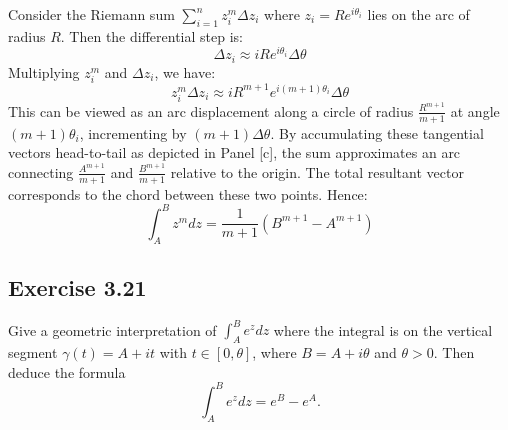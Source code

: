\documentclass{article}
\begin{document}
\begin{solution}
\begin{center}
  \end{center}

  \vspace{1em}
  Consider the Riemann sum $\sum_{i=1}^{n} z_i^m \Delta z_i$ where
  $z_i = Re^{i\theta_i}$ lies on the arc of radius $R$. Then the
  differential step is:
  \[
    \Delta z_i \approx iRe^{i\theta_i}\Delta\theta
  \]
  Multiplying $z_i^m$ and $\Delta z_i$, we have:
  \[
    z_i^m \Delta z_i \approx iR^{m+1}e^{i(m+1)\theta_i}\Delta\theta
  \]
  This can be viewed as an arc displacement along a circle of radius
  $\frac{R^{m+1}}{m+1}$ at angle $(m+1)\theta_i$, incrementing by
  $(m+1)\Delta\theta$. By accumulating these tangential vectors
  head-to-tail as depicted in Panel [c], the sum approximates an arc
  connecting $\frac{A^{m+1}}{m+1}$ and $\frac{B^{m+1}}{m+1}$ relative
  to the origin. The total resultant vector corresponds to the chord
  between these two points. Hence:
  \[
    \int_A^B z^m dz = \frac{1}{m+1}(B^{m+1} - A^{m+1})
  \]

\end{solution}

\subsection{Exercise 3.21}

Give a geometric interpretation of $\int_A^B e^z dz$ where the
integral is on the vertical segment $\gamma(t) = A + it$ with $t \in
[0, \theta]$, where $B = A + i\theta$ and $\theta > 0$. Then deduce the formula
\[
  \int_A^B e^z dz = e^B - e^A.
\]
\end{document}
